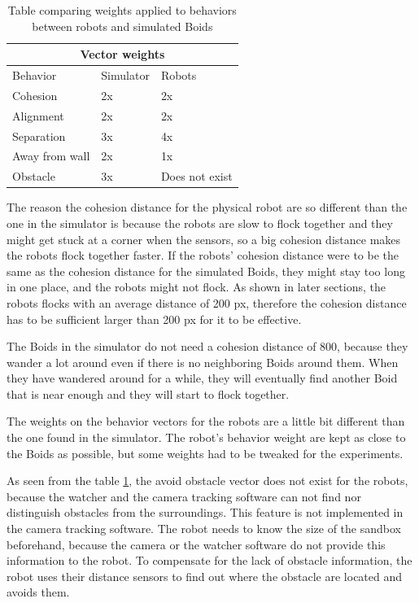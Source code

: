 \begin{table}[h]
\begin{center}

\begin{tabular}{|l|l|l|}
\hline
\multicolumn{3}{|c|}{Vector weights} \\ \hline
Behavior        & Simulator & Robots \\ \hline
Cohesion        & 2x        & 2x     \\ \hline
Alignment       & 2x        & 2x     \\ \hline
Separation      & 3x        & 4x     \\ \hline
Away from wall  & 2x        & 1x     \\ \hline
Obstacle        & 3x        & Does not exist   \\ \hline
\end{tabular}
\end{center}
\caption[Weights comparison]{Table comparing weights applied to behaviors between robots and simulated Boids}
\label{tab:weights}
\end{table}

The reason the cohesion distance for the physical robot are so different than the one in the simulator is because the robots are slow to flock together and they might get stuck at a corner when the sensors, so a big cohesion distance makes the robots flock together faster. If the robots' cohesion distance were to be the same as the cohesion distance for the simulated Boids, they might stay too long in one place, and the robots might not flock. As shown in later sections, the robots flocks with an average distance of 200 px, therefore the cohesion distance has to be sufficient larger than 200 px for it to be effective. 

The Boids in the simulator do not need a cohesion distance of 800, because they wander a lot around even if there is no neighboring Boids around them. When they have wandered around for a while, they will eventually find another Boid that is near enough and they will start to flock together.

The weights on the behavior vectors for the robots are a little bit different than the one found in the simulator. The robot's behavior weight are kept as close to the Boids as possible, but some weights had to be tweaked for the experiments.

As seen from the table \ref{tab:weights}, the avoid obstacle vector does not exist for the robots, because the watcher and the camera tracking software can not find nor distinguish obstacles from the surroundings. This feature is not implemented in the camera tracking software. The robot needs to know the size of the sandbox beforehand, because the camera or the watcher software do not provide this information to the robot. To compensate for the lack of obstacle information, the robot uses their distance sensors to find out where the obstacle are located and avoids them.

